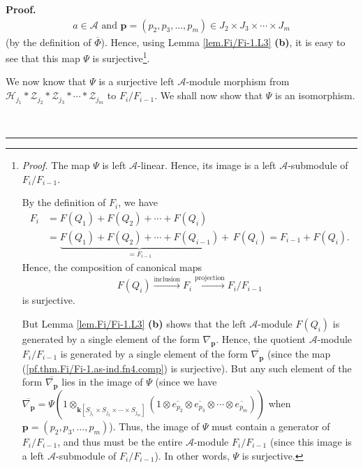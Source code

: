 \documentclass[numbers=enddot,12pt,final,onecolumn,notitlepage]{scrartcl}%
\theoremstyle{definition}
\newenvironment{proof}[1][Proof]{\noindent\textbf{#1.} }{\ \rule{0.5em}{0.5em}}
\begin{document}
\begin{proof}
\begin{align*}
{}a\in\mathcal{A}\text{ and }\mathbf{p}=\left(  p_{2},p_{3},\ldots
,p_{m}\right)  \in J_{2}\times J_{3}\times\cdots\times J_{m}%
\end{align*}
(by the definition of $\overline{\Phi}$). Hence, using Lemma
\ref{lem.Fi/Fi-1.L3} \textbf{(b)}, it is easy to see that this map $\Psi$ is
surjective\footnote{\textit{Proof.} The map $\Psi$ is left $\mathcal{A}%
$-linear. Hence, its image is a left $\mathcal{A}$-submodule of $F_{i}%
/F_{i-1}$.
\par
By the definition of $F_{i}$, we have%
\begin{align*}
F_{i}  &  =F\left(  Q_{1}\right)  +F\left(  Q_{2}\right)  +\cdots+F\left(
Q_{i}\right) \\
&  =\underbrace{F\left(  Q_{1}\right)  +F\left(  Q_{2}\right)  +\cdots
+F\left(  Q_{i-1}\right)  }_{=F_{i-1}}+\,F\left(  Q_{i}\right)  =F_{i-1}%
+F\left(  Q_{i}\right)  .
\end{align*}
Hence, the composition of canonical maps
\begin{equation}
F\left(  Q_{i}\right)  \overset{\text{inclusion}}{\longrightarrow}%
F_{i}\overset{\text{projection}}{\longrightarrow}F_{i}/F_{i-1}
\label{pf.thm.Fi/Fi-1.as-ind.fn4.comp}%
\end{equation}
is surjective.
\par
But Lemma \ref{lem.Fi/Fi-1.L3} \textbf{(b)} shows that the left $\mathcal{A}%
$-module $F\left(  Q_{i}\right)  $ is generated by a single element of the
form $\nabla_{\mathbf{p}}$. Hence, the quotient $\mathcal{A}$-module
$F_{i}/F_{i-1}$ is generated by a single element of the form $\overline
{\nabla_{\mathbf{p}}}$ (since the map (\ref{pf.thm.Fi/Fi-1.as-ind.fn4.comp})
is surjective). But any such element of the form $\overline{\nabla
_{\mathbf{p}}}$ lies in the image of $\Psi$ (since we have $\overline
{\nabla_{\mathbf{p}}}=\Psi\left(  1\otimes_{\mathbf{k}\left[  S_{j_{1}}\times
S_{j_{2}}\times\cdots\times S_{j_{m}}\right]  }\left(  1\otimes\overline
{e_{p_{2}}}\otimes\overline{e_{p_{3}}}\otimes\cdots\otimes\overline{e_{p_{m}}%
}\right)  \right)  $ when $\mathbf{p}=\left(  p_{2},p_{3},\ldots,p_{m}\right)
$). Thus, the image of $\Psi$ must contain a generator of $F_{i}/F_{i-1}$, and
thus must be the entire $\mathcal{A}$-module $F_{i}/F_{i-1}$ (since this image
is a left $\mathcal{A}$-submodule of $F_{i}/F_{i-1}$). In other words, $\Psi$
is surjective.}.

We now know that $\Psi$ is a surjective left $\mathcal{A}$-module morphism
from $\mathcal{H}_{j_{1}}\ast\mathcal{Z}_{j_{2}}\ast\mathcal{Z}_{j_{3}}%
\ast\cdots\ast\mathcal{Z}_{j_{m}}$ to $F_{i}/F_{i-1}$. We shall now show that
$\Psi$ is an isomorphism.


\end{proof}
\end{document}
